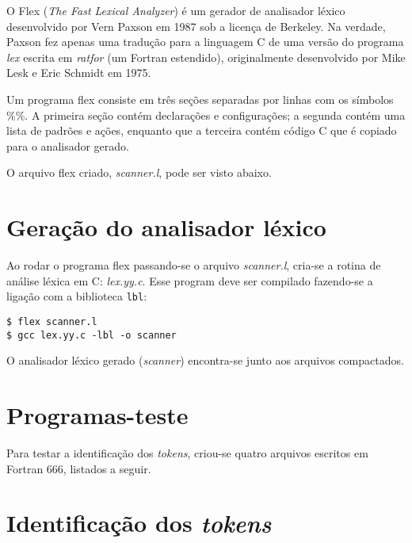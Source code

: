\documentclass[a4paper,12pt]{article}
\begin{document}
O Flex (\emph{The Fast Lexical Analyzer}) é um gerador de analisador léxico desenvolvido por Vern Paxson em 1987 sob a licença de Berkeley. Na verdade, Paxson fez apenas uma tradução para a linguagem C de uma versão do programa \emph{lex} escrita em \emph{ratfor} (um Fortran estendido), originalmente desenvolvido por Mike Lesk e Eric Schmidt em 1975.

Um programa flex consiste em três seções separadas por linhas com os símbolos \%\%. A primeira seção contém declarações e configurações; a segunda contém uma lista de padrões e ações, enquanto que a terceira contém código C que é copiado para o analisador gerado.

O arquivo flex criado, \emph{scanner.l}, pode ser visto abaixo. 




\section{Geração do analisador léxico}

Ao rodar o programa flex passando-se o arquivo \emph{scanner.l}, cria-se a rotina de análise léxica em C: \emph{lex.yy.c}. Esse program deve ser compilado fazendo-se a ligação com a biblioteca \texttt{lbl}:

\begin{verbatim}
$ flex scanner.l
$ gcc lex.yy.c -lbl -o scanner
\end{verbatim}
%
O analisador léxico gerado (\emph{scanner}) encontra-se junto aos arquivos compactados.


\section{Programas-teste}

Para testar a identificação dos \emph{tokens}, criou-se quatro arquivos escritos em Fortran 666, listados a seguir.







\section{Identificação dos \emph{tokens}}
\end{document}
